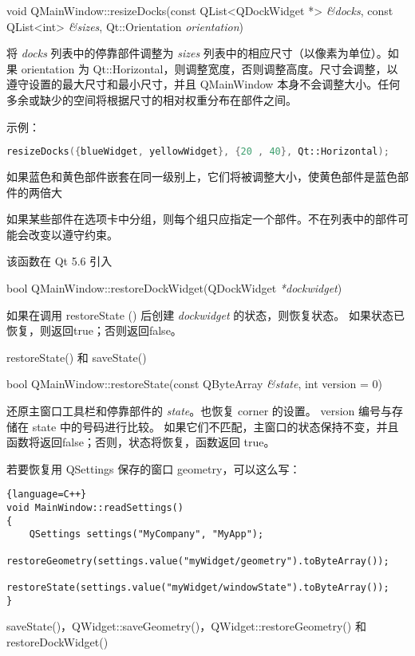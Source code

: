 \splitLine

void QMainWindow::resizeDocks(const QList<QDockWidget *> \emph{\&docks},
 const QList<int> \emph{\&sizes}, Qt::Orientation \emph{orientation})

将 \emph{docks} 列表中的停靠部件调整为 \emph{sizes} 列表中的相应尺寸（以像素为单位）。如果 orientation 为 Qt::Horizontal，则调整宽度，否则调整高度。尺寸会调整，以遵守设置的最大尺寸和最小尺寸，并且 QMainWindow 本身不会调整大小。任何多余或缺少的空间将根据尺寸的相对权重分布在部件之间。

示例：

\begin{lstlisting}[language=C++]
resizeDocks({blueWidget, yellowWidget}, {20 , 40}, Qt::Horizontal);
\end{lstlisting}


如果蓝色和黄色部件嵌套在同一级别上，它们将被调整大小，使黄色部件是蓝色部件的两倍大

如果某些部件在选项卡中分组，则每个组只应指定一个部件。不在列表中的部件可能会改变以遵守约束。

该函数在 Qt 5.6 引入

\splitLine

bool QMainWindow::restoreDockWidget(QDockWidget \emph{*dockwidget})

如果在调用 restoreState () 后创建 \emph{dockwidget} 的状态，则恢复状态。
如果状态已恢复，则返回true；否则返回false。

\begin{seeAlso}
restoreState() 和 saveState()
\end{seeAlso}

\splitLine

bool QMainWindow::restoreState(const QByteArray \emph{\&state}, int version = 0)

还原主窗口工具栏和停靠部件的 \emph{state}。也恢复 corner 的设置。
version 编号与存储在 state 中的号码进行比较。
如果它们不匹配，主窗口的状态保持不变，并且函数将返回false；否则，状态将恢复，函数返回 true。

若要恢复用 QSettings 保存的窗口 geometry，可以这么写：

\begin{lstlisting}{language=C++}
void MainWindow::readSettings()
{
    QSettings settings("MyCompany", "MyApp");
    restoreGeometry(settings.value("myWidget/geometry").toByteArray());
    restoreState(settings.value("myWidget/windowState").toByteArray());
}
\end{lstlisting}

\begin{seeAlso}
saveState()，QWidget::saveGeometry()，QWidget::restoreGeometry() 和 restoreDockWidget()
\end{seeAlso}


